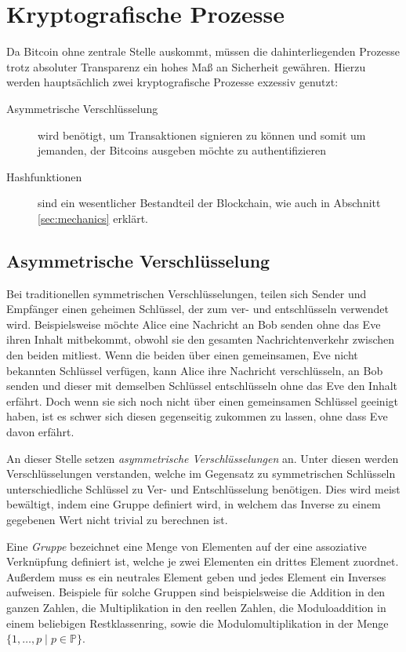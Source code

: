 \section{Kryptografische Prozesse}

Da Bitcoin ohne zentrale Stelle auskommt, müssen die dahinterliegenden Prozesse trotz absoluter Transparenz ein hohes Maß an Sicherheit gewähren.
Hierzu werden hauptsächlich zwei kryptografische Prozesse exzessiv genutzt:
\begin{description}
    \item[Asymmetrische Verschlüsselung] wird benötigt, um Transaktionen signieren zu können und somit um jemanden, der Bitcoins ausgeben möchte zu authentifizieren
    \item[Hashfunktionen] sind ein wesentlicher Bestandteil der Blockchain, wie auch in Abschnitt \ref{sec:mechanics} erklärt.
\end{description}

\subsection{Asymmetrische Verschlüsselung}

Bei traditionellen symmetrischen Verschlüsselungen, teilen sich Sender und Empfänger einen geheimen Schlüssel, der zum ver- und entschlüsseln verwendet wird.
Beispielsweise möchte Alice eine Nachricht an Bob senden ohne das Eve ihren Inhalt mitbekommt, obwohl sie den gesamten Nachrichtenverkehr zwischen den beiden mitliest.
Wenn die beiden über einen gemeinsamen, Eve nicht bekannten Schlüssel verfügen, kann Alice ihre Nachricht verschlüsseln, an Bob senden und dieser mit demselben Schlüssel entschlüsseln ohne das Eve den Inhalt erfährt.
Doch wenn sie sich noch nicht über einen gemeinsamen Schlüssel geeinigt haben, ist es schwer sich diesen gegenseitig zukommen zu lassen, ohne dass Eve davon erfährt.

An dieser Stelle setzen \emph{asymmetrische Verschlüsselungen} an.
Unter diesen werden Verschlüsselungen verstanden, welche im Gegensatz zu symmetrischen Schlüsseln unterschiedliche Schlüssel zu Ver- und Entschlüsselung benötigen.
Dies wird meist bewältigt, indem eine Gruppe definiert wird, in welchem das Inverse zu einem gegebenen Wert nicht trivial zu berechnen ist.

Eine \emph{Gruppe} bezeichnet eine Menge von Elementen auf der eine assoziative Verknüpfung definiert ist, welche je zwei Elementen ein drittes Element zuordnet.
Außerdem muss es ein neutrales Element geben und jedes Element ein Inverses aufweisen.
Beispiele für solche Gruppen sind beispielsweise die Addition in den ganzen Zahlen, die Multiplikation in den reellen Zahlen, die Moduloaddition in einem beliebigen Restklassenring, sowie die Modulomultiplikation in der Menge $\{ 1, \dotsc, p \mid p \in \mathbb{P}\}$.

